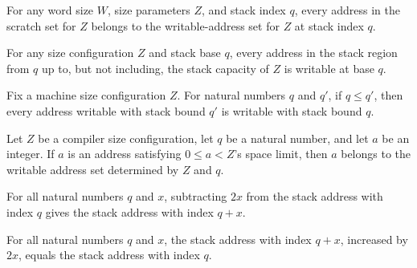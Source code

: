 \begin{theorem}
\label{Light.Compiler.scratch_subset_writable}
\leanok
{}
For any word size $W$, size parameters $Z$, and stack index $q$, every address in the
scratch set for $Z$ belongs to the writable-address set for $Z$ at stack index $q$.
\end{theorem}

\begin{theorem}
\label{Light.Compiler.stack_subset_writable}
\leanok
{}
For any size configuration $Z$ and stack base $q$, every address in the stack region
from $q$ up to, but not including, the stack capacity of $Z$ is writable at base $q$.
\end{theorem}

\begin{theorem}
\label{Light.Compiler.writable_subset_writable}
\leanok
{}
Fix a machine size configuration $Z$. For natural numbers $q$ and $q'$, if $q\le q'$,
then every address writable with stack bound $q'$ is writable with stack bound $q$.
\end{theorem}

\begin{theorem}
\label{Light.Compiler.mem_writable_of_addr}
\leanok
{}
Let $Z$ be a compiler size configuration, let $q$ be a natural number, and let $a$ be an
integer. If $a$ is an address satisfying $0\le a<Z$'s space limit, then $a$ belongs to
the writable address set determined by $Z$ and $q$.
\end{theorem}

\begin{theorem}
\label{Light.Compiler.cStack_sub}
\leanok
{}
For all natural numbers $q$ and $x$, subtracting $2x$ from the stack address with index
$q$ gives the stack address with index $q+x$.
\end{theorem}

\begin{theorem}
\label{Light.Compiler.cStack_add}
\leanok
{}
For all natural numbers $q$ and $x$, the stack address with index $q+x$, increased by
$2x$, equals the stack address with index $q$.
\end{theorem}

